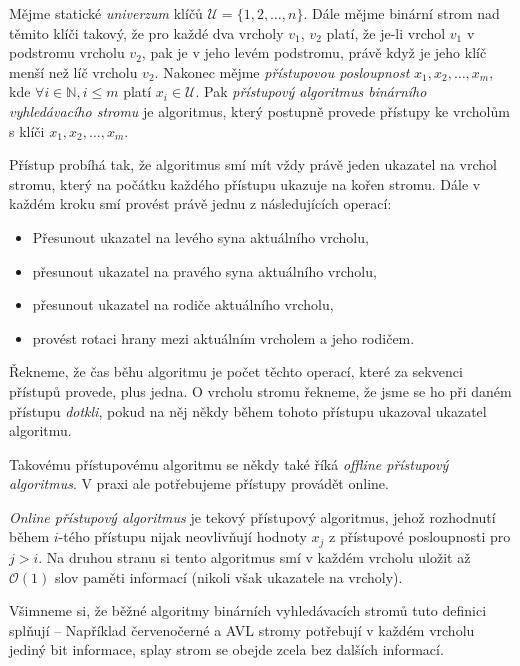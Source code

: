 \begin{definice}
Mějme statické \emph{univerzum} klíčů $\mathcal U = \{1,2,\dots,n\}$. Dále
mějme binární strom nad těmito klíči takový, že pro každé dva vrcholy $v_1$,
$v_2$ platí, že je-li vrchol $v_1$ v podstromu vrcholu $v_2$, pak je v jeho
levém podstromu, právě když je jeho klíč menší než líč vrcholu $v_2$. Nakonec
mějme \emph{přístupovou posloupnost} $x_1,x_2,\dots,x_m$, kde $\forall i \in
\mathbb N, i\leq m$ platí $x_i\in \mathcal U$. Pak \emph{přístupový algoritmus
binárního vyhledávacího stromu} je algoritmus, který postupně provede přístupy
ke vrcholům s klíči $x_1, x_2,\dots,x_m$.

Přístup probíhá tak, že algoritmus smí mít vždy právě jeden ukazatel na vrchol
stromu, který na počátku každého přístupu ukazuje na kořen stromu. Dále v
každém kroku smí provést právě jednu z následujících operací: 
\begin{itemize}
\item Přesunout ukazatel na levého syna aktuálního vrcholu,
\item přesunout ukazatel na pravého syna aktuálního vrcholu,
\item přesunout ukazatel na rodiče aktuálního vrcholu,
\item provést rotaci hrany mezi aktuálním vrcholem a jeho rodičem.
\end{itemize}

Řekneme, že čas běhu algoritmu je počet těchto operací, které za sekvenci
přístupů provede, plus jedna. O vrcholu stromu řekneme, že jsme se ho při daném
přístupu \emph{dotkli}, pokud na něj někdy během tohoto přístupu ukazoval
ukazatel algoritmu.  \end{definice}

Takovému přístupovému algoritmu se někdy také říká \emph{offline přístupový
algoritmus}. V praxi ale potřebujeme přístupy provádět online.

\begin{definice}
\emph{Online přístupový algoritmus} je tekový přístupový algoritmus, jehož
rozhodnutí během $i$-tého přístupu nijak neovlivňují hodnoty $x_j$ z přístupové
posloupnosti pro $j>i$. Na druhou stranu si tento algoritmus smí v každém
vrcholu uložit až $\mathcal O(1)$ slov paměti informací (nikoli však ukazatele
na vrcholy).  
\end{definice}

Všimneme si, že běžné algoritmy binárních vyhledávacích stromů tuto definici
splňují -- Například červenočerné a AVL stromy potřebují v každém vrcholu
jediný bit informace, splay strom se obejde zcela bez dalších informací.

